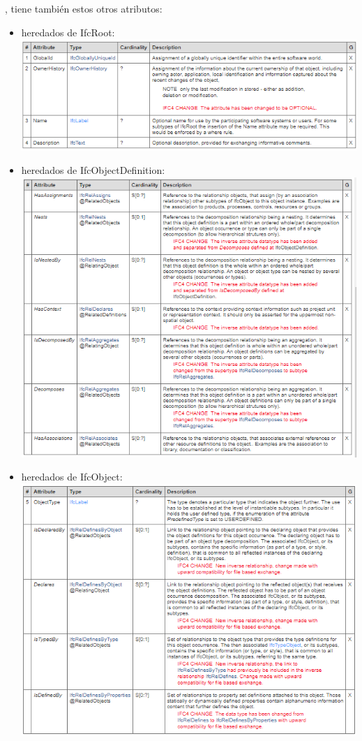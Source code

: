 \documentclass[spanish,12pt,a4paper,final,oneside]{book}
\begin{document}
, tiene también estos otros atributos:
\begin{itemize}
\item heredados de IfcRoot:
\\ \includegraphics[width=.7\textwidth]{atributos de IfcRoot}

\item heredados de IfcObjectDefinition:
\\ \includegraphics[width=.7\textwidth]{atributos de IfcObjectDefinition}

\item heredados de IfcObject:
\\ \includegraphics[width=.8\textwidth]{atributos de IfcObject}


\end{itemize}
\end{document}
